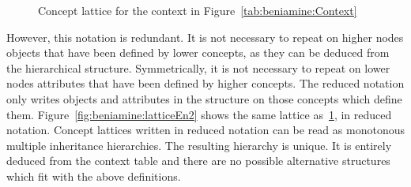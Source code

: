 \documentclass[output=paper]{langscibook}
\begin{document}
    \begin{figure}
        
        \caption{Concept lattice for the context in Figure~\ref{tab:beniamine:Context}}
        \label{fig:beniamine:latticeEn}
    \end{figure}
    
    However, this notation is redundant. It is not necessary to repeat on higher nodes objects that have been defined by lower concepts, as they can be deduced from the hierarchical structure. Symmetrically, it is not necessary to repeat on lower nodes attributes that have been defined by higher concepts. The reduced notation only writes objects and attributes in the structure on those concepts which define them. Figure~\ref{fig:beniamine:latticeEn2} shows the same lattice as~\ref{fig:beniamine:latticeEn}, in reduced notation. Concept lattices written in reduced notation can be read as monotonous multiple inheritance hierarchies. The resulting hierarchy is unique. It is entirely deduced from the context table and there are no possible alternative structures which fit with the above definitions.
    
\end{document}
